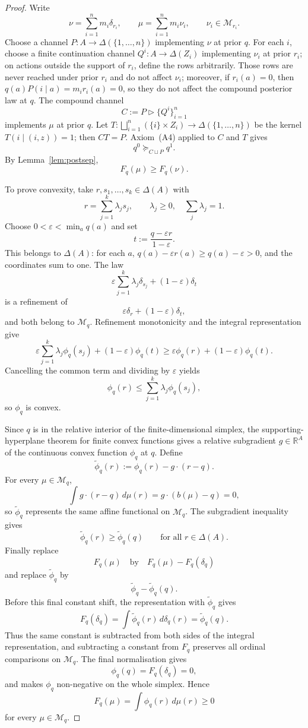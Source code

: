 \documentclass[11pt,a4paper]{article}
\theoremstyle{definition}
\newcommand{\R}{\mathbb R}
\newcommand{\1}{\mathbf 1}
\begin{document}
\begin{proof}
Write
\[
\nu=\sum_{i=1}^n m_i\delta_{r_i},
\qquad
\mu=\sum_{i=1}^n m_i\nu_i,
\qquad
\nu_i\in\mathcal M_{r_i}.
\]
Choose a channel $P:A\to\Delta(\{1,\dots,n\})$ implementing $\nu$ at prior $q$.  For each $i$, choose a finite
continuation channel $Q^i:A\to\Delta(Z_i)$ implementing $\nu_i$ at prior $r_i$; on actions outside the support of
$r_i$, define the rows arbitrarily.  Those rows are never reached under prior $r_i$ and do not affect $\nu_i$; moreover,
if $r_i(a)=0$, then $q(a)P(i\mid a)=m_i r_i(a)=0$, so they do not affect the compound posterior law at $q$.  The compound
channel
\[
C:=P\triangleright\{Q^i\}_{i=1}^n
\]
implements $\mu$ at prior $q$.  Let $T:\bigsqcup_{i=1}^n(\{i\}\times Z_i)\to\Delta(\{1,\dots,n\})$ be the kernel
$T(i\mid(i,z))=1$; then $CT=P$.  Axiom~\textup{(A4)} applied to $C$ and $T$ gives
\[
q^0\succeq_{C\sqcup P}q^1.
\]
By Lemma~\ref{lem:postsep},
\[
F_q(\mu)\ge F_q(\nu).
\]

To prove convexity, take $r,s_1,\dots,s_k\in\Delta(A)$ with
\[
r=\sum_{j=1}^k\lambda_j s_j,
\qquad
\lambda_j\ge 0,\quad \sum_j\lambda_j=1.
\]
Choose $0<\varepsilon<\min_a q(a)$ and set
\[
t:=\frac{q-\varepsilon r}{1-\varepsilon}.
\]
This belongs to $\Delta(A)$: for each $a$, $q(a)-\varepsilon r(a)\ge q(a)-\varepsilon>0$, and the coordinates sum to one.
The law
\[
\varepsilon\sum_{j=1}^k\lambda_j\delta_{s_j}+(1-\varepsilon)\delta_t
\]
is a refinement of
\[
\varepsilon\delta_r+(1-\varepsilon)\delta_t,
\]
and both belong to $\mathcal M_q$.  Refinement monotonicity and the integral representation give
\[
\varepsilon\sum_{j=1}^k\lambda_j\phi_q(s_j)+(1-\varepsilon)\phi_q(t)
\ge
\varepsilon\phi_q(r)+(1-\varepsilon)\phi_q(t).
\]
Cancelling the common term and dividing by $\varepsilon$ yields
\[
\phi_q(r)\le \sum_{j=1}^k\lambda_j\phi_q(s_j),
\]
so $\phi_q$ is convex.

Since $q$ is in the relative interior of the finite-dimensional simplex, the supporting-hyperplane theorem for finite
convex functions gives a relative subgradient $g\in\R^A$ of the continuous convex function $\phi_q$ at $q$.  Define
\[
\widetilde\phi_q(r):=\phi_q(r)-g\cdot(r-q).
\]
For every $\mu\in\mathcal M_q$,
\[
\int g\cdot(r-q)\,d\mu(r)=g\cdot(b(\mu)-q)=0,
\]
so $\widetilde\phi_q$ represents the same affine functional on $\mathcal M_q$.  The subgradient inequality gives
\[
\widetilde\phi_q(r)\ge \widetilde\phi_q(q)
\qquad\text{for all }r\in\Delta(A).
\]
Finally replace
\[
F_q(\mu)\quad\text{by}\quad F_q(\mu)-F_q(\delta_q)
\]
and replace $\widetilde\phi_q$ by
\[
\widetilde\phi_q-\widetilde\phi_q(q).
\]
Before this final constant shift, the representation with $\widetilde\phi_q$ gives
\[
F_q(\delta_q)=\int \widetilde\phi_q(r)\,d\delta_q(r)=\widetilde\phi_q(q).
\]
Thus the same constant is subtracted from both sides of the integral representation, and subtracting a constant from
$F_q$ preserves all ordinal comparisons on $\mathcal M_q$.  The final normalisation gives
\[
\phi_q(q)=F_q(\delta_q)=0,
\]
and makes $\phi_q$ non-negative on the whole simplex.  Hence
\[
F_q(\mu)=\int\phi_q(r)\,d\mu(r)\ge 0
\]
for every $\mu\in\mathcal M_q$.
\end{proof}
\end{document}
